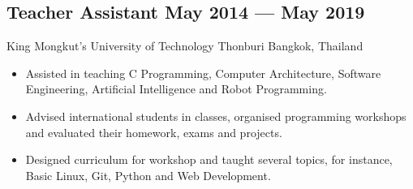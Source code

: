\documentclass{article}
\newcommand{\subtext}[1]{
#1\par\vspace{-0.2cm}}
\newenvironment{zitemize}{
\begin{itemize}\itemsep0pt \parskip0pt \parsep1pt}
{\end{itemize}\vspace{-0.5cm}}
\newcommand{\hskills}[1]{
\textbf{\bfseries #1} }
\begin{document}
        \vspace{0.2cm}

        \subsection*{Teacher Assistant \hfill May 2014 --- May 2019}
        \subtext{King Mongkut's University of Technology Thonburi \hfill Bangkok, Thailand}
            \vspace{0.05cm}
            \begin{zitemize}
                \item Assisted in teaching C Programming, Computer Architecture, Software Engineering, Artificial Intelligence and Robot Programming.
                \item Advised international students in classes, organised programming workshops and evaluated their homework, exams and projects.
                \item Designed curriculum for workshop and taught several topics, for instance, Basic Linux, Git, Python and Web Development.
            \end{zitemize}



\end{document}
